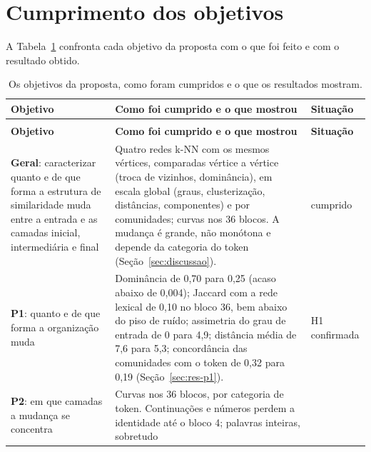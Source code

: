 \section{Cumprimento dos objetivos}\label{sec:objetivos}

A Tabela~\ref{tab:objetivos} confronta cada objetivo da proposta com o que foi feito e com o
resultado obtido.

\begingroup
\small
\renewcommand{\arraystretch}{1.08}
\setlength{\LTpre}{2pt}\setlength{\LTpost}{0pt}
\begin{longtable}{@{}>{\raggedright\arraybackslash}p{3.5cm}
    >{\raggedright\arraybackslash}p{10.7cm} >{\raggedright\arraybackslash}p{1.9cm}@{}}
\caption{Os objetivos da proposta, como foram cumpridos e o que os resultados
mostram.}\label{tab:objetivos}\\
\toprule
\textbf{Objetivo} & \textbf{Como foi cumprido e o que mostrou} & \textbf{Situação} \\
\midrule
\endfirsthead
\multicolumn{3}{@{}l}{\footnotesize\itshape Tabela~\ref{tab:objetivos} (continuação)}\\
\toprule
\textbf{Objetivo} & \textbf{Como foi cumprido e o que mostrou} & \textbf{Situação} \\
\midrule
\endhead
\textbf{Geral}: caracterizar quanto e de que forma a estrutura de similaridade muda entre a
entrada e as camadas inicial, intermediária e final &
Quatro redes k-NN com os mesmos \nVertices{} vértices, comparadas vértice a vértice (troca de
vizinhos, dominância), em escala global (graus, clusterização, distâncias, componentes) e por
comunidades; curvas nos 36 blocos. A mudança é grande, não monótona e depende da categoria do
token (Seção~\ref{sec:discussao}). & cumprido \\
\midrule
\textbf{P1}: quanto e de que forma a organização muda &
Dominância de 0,70 para 0,25 (acaso abaixo de 0,004); Jaccard com a rede lexical de 0,10 no
bloco 36, bem abaixo do piso de ruído; assimetria do grau de entrada de 0 para 4,9; distância
média de 7,6 para 5,3; concordância das comunidades com o token de 0,32 para 0,19
(Seção~\ref{sec:res-p1}). & H1 confirmada \\
\midrule
\textbf{P2}: em que camadas a mudança se concentra &
Curvas nos 36 blocos, por categoria de token. Continuações e números perdem a identidade até o bloco 4; palavras inteiras, sobretudo

\end{longtable}
